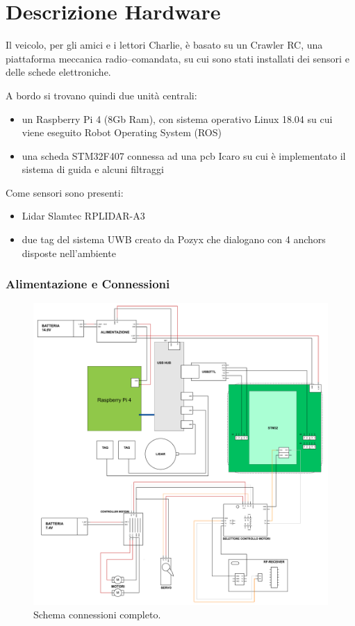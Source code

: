 \newpage
\section{Descrizione Hardware}

Il veicolo, per gli amici e i lettori Charlie, è basato su un Crawler RC, una piattaforma meccanica radio--comandata,  su cui sono stati installati dei sensori e 
delle schede elettroniche. 

A bordo si trovano quindi due unità centrali:
\begin{itemize}
	\item un Raspberry Pi 4 (8Gb Ram), con sistema operativo Linux 18.04 su cui viene eseguito Robot Operating System (ROS)
	\item una scheda STM32F407 connessa ad una pcb Icaro su cui è implementato il sistema di guida e alcuni filtraggi
\end{itemize}

Come sensori sono presenti:
\begin{itemize}
	\item Lidar Slamtec RPLIDAR-A3
	
	\item due tag del sistema UWB creato da Pozyx che dialogano con 4 anchors disposte nell'ambiente
\end{itemize}

\subsubsection*{Alimentazione e Connessioni}

\begin{figure}[] 
	\centering    
	\includegraphics[width=1\textwidth]{schema_completo.pdf}
	\caption{Schema connessioni completo.}
	\label{fig:schema_completo}
\end{figure}

